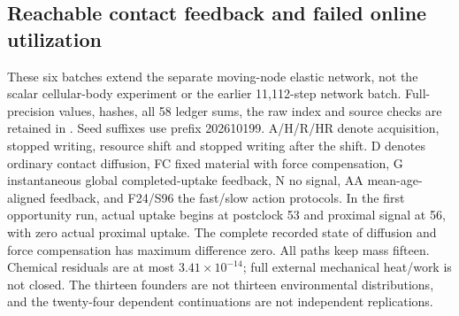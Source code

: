\subsection*{Reachable contact feedback and failed online utilization}
These six batches extend the separate moving-node elastic network, not the scalar cellular-body experiment or the earlier 11,112-step network batch. Full-precision values, hashes, all 58 ledger sums, the raw index and source checks are retained in . Seed suffixes use prefix 202610199. A/H/R/HR denote acquisition, stopped writing, resource shift and stopped writing after the shift. D denotes ordinary contact diffusion, FC fixed material with force compensation, G instantaneous global completed-uptake feedback, N no signal, AA mean-age-aligned feedback, and F24/S96 the fast/slow action protocols. In the first opportunity run, actual uptake begins at postclock 53 and proximal signal at 56, with zero actual proximal uptake. The complete recorded state of diffusion and force compensation has maximum difference zero. All paths keep mass fifteen. Chemical residuals are at most $3.41\times10^{-14}$; full external mechanical heat/work is not closed. The thirteen founders are not thirteen environmental distributions, and the twenty-four dependent continuations are not independent replications.
\begingroup\scriptsize\setlength{\tabcolsep}{3pt}
